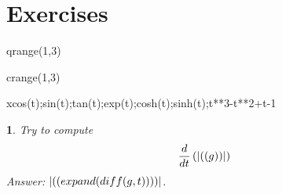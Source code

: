 \documentclass[a4paper,twoside,leqno]{article}
\newcounter{exer}
\numberwithin{exer}{subsection}
\theoremstyle{exer}
\newtheorem{exe}[exer]{}
\begin{document}
\section{Exercises}

\begin{symfor}{q}{range(1,3)}%
\begin{symfor}{c}{range(1,3)}%
\begin{symfor}{x}{cos(t);sin(t);tan(t);exp(t);cosh(t);sinh(t);t**3-t**2+t-1}%

\begin{exe}
Try to compute 
\[
\dfrac{d}{dt} \left( \sym{g} \right) 
\]
Answer: $\sym{expand(diff(g,t))}$. 
\end{exe}
\end{symfor}

\end{symfor}
\end{symfor}
\end{document}
